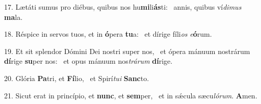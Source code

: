 17. Lætáti sumus pro diébus, quibus nos hu\textbf{mi}li\textbf{ás}ti: \ast\  annis, quibus ví\textit{di}\textit{mus} \textbf{ma}la.\

18. Réspice in servos tuos, et in \textbf{ó}pera \textbf{tu}a: \ast\  et dírige fíli\textit{os} \textit{e}\textbf{ó}rum.\

19. Et sit splendor Dómini Dei nostri super nos, \dag\  et ópera mánuum nostrárum \textbf{dí}rige \textbf{su}per nos: \ast\  et opus mánuum nos\textit{trá}\textit{rum} \textbf{dí}rige.\

20. Glória \textbf{Pa}tri, et \textbf{Fí}lio, \ast\  et Spirí\textit{tu}\textit{i} \textbf{Sanc}to.\

21. Sicut erat in princípio, et \textbf{nunc}, et \textbf{sem}per, \ast\  et in sǽcula sæcu\textit{ló}\textit{rum}. \textbf{A}men.\

